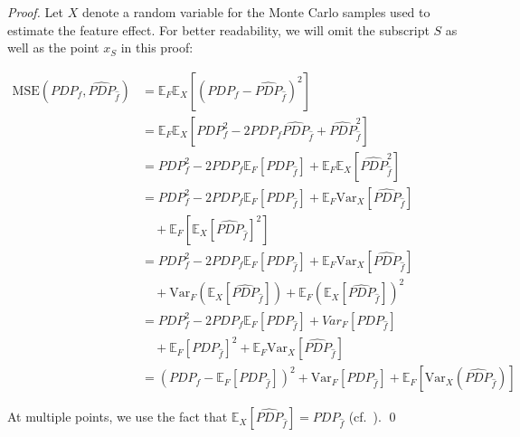 \documentclass[runningheads]{llncs}
\begin{document}
\begin{proof}
    Let $X$ denote a random variable for the Monte Carlo samples used to estimate the feature effect.
    For better readability, we will omit the subscript $S$ as well as the point $x_S$ in this proof:

    \begin{align*}
        \text{MSE}(PDP_{f}, \widehat{PDP}_{\hat f})
         & = \mathbb{E}_F\mathbb{E}_X[{(PDP_f - \widehat{PDP}_{\hat f})}^2]                                                             \\
         & = \mathbb{E}_F \mathbb{E}_X[PDP_f^2 - 2PDP_f\widehat{PDP}_{\hat f} + \widehat{PDP}_{\hat f}^2]                               \\
         & = PDP_f^2 - 2PDP_f\mathbb{E}_F[PDP_{\hat f}] + \mathbb{E}_F\mathbb{E}_X[\widehat{PDP}_{\hat f}^2]                            \\
         & = PDP_f^2 - 2PDP_f\mathbb{E}_F[PDP_{\hat f}] + \mathbb{E}_F\text{Var}_X[\widehat{PDP}_{\hat f}]                              \\
         & \quad + \mathbb{E}_F[\mathbb{E}_X{[\widehat{PDP}_{\hat f}]}^2]                                                               \\
         & = PDP_f^2 - 2PDP_f\mathbb{E}_F[PDP_{\hat f}] + \mathbb{E}_F\text{Var}_X[\widehat{PDP}_{\hat f}]                              \\
         & \quad + \text{Var}_F(\mathbb{E}_X[\widehat{PDP}_{\hat f}]) + \mathbb{E}_F{(\mathbb{E}_X[\widehat{PDP}_{\hat f}])}^2          \\
         & = PDP_f^2 - 2PDP_f\mathbb{E}_F[PDP_{\hat f}] +  Var_F[PDP_{\hat f}]                                                          \\
         & \quad + \mathbb{E}_F{[PDP_{\hat f}]}^2 + \mathbb{E}_F\text{Var}_X[\widehat{PDP}_{\hat f}]                                    \\
         & = {(PDP_f - \mathbb{E}_F[PDP_{\hat f}])}^2 + \text{Var}_F[PDP_{\hat f}] + \mathbb{E}_F[\text{Var}_X(\widehat{PDP}_{\hat f})]
    \end{align*}

    \noindent At multiple points, we use the fact that $\mathbb{E}_X[\widehat{PDP}_{\hat f}]
        = PDP_{\hat f}$ (cf.~\cite{molnar_relating_2023}).
        \qed\
\end{proof}
\end{document}
